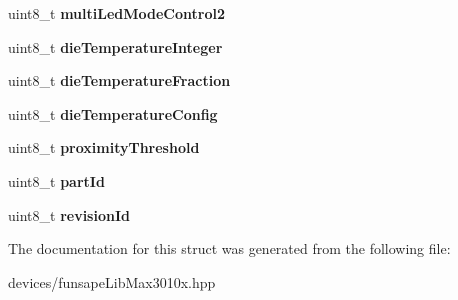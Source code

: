 \begin{DoxyCompactItemize}
\item 
\hypertarget{struct_max3010x_1_1_register_map_a3b161864d02cb2266e9137d4e24dc054}{}uint8\+\_\+t {\bfseries multi\+Led\+Mode\+Control2}\label{struct_max3010x_1_1_register_map_a3b161864d02cb2266e9137d4e24dc054}

\item 
\hypertarget{struct_max3010x_1_1_register_map_a33a9a4aba4610622715cedad48a55113}{}uint8\+\_\+t {\bfseries die\+Temperature\+Integer}\label{struct_max3010x_1_1_register_map_a33a9a4aba4610622715cedad48a55113}

\item 
\hypertarget{struct_max3010x_1_1_register_map_a00fda2118f70e025ae9ece2a9a7899a3}{}uint8\+\_\+t {\bfseries die\+Temperature\+Fraction}\label{struct_max3010x_1_1_register_map_a00fda2118f70e025ae9ece2a9a7899a3}

\item 
\hypertarget{struct_max3010x_1_1_register_map_aabccb8db2ec29ea00fe6a04534e6ecab}{}uint8\+\_\+t {\bfseries die\+Temperature\+Config}\label{struct_max3010x_1_1_register_map_aabccb8db2ec29ea00fe6a04534e6ecab}

\item 
\hypertarget{struct_max3010x_1_1_register_map_a883c8fdd281ff27168a7cd62fe6a4b0d}{}uint8\+\_\+t {\bfseries proximity\+Threshold}\label{struct_max3010x_1_1_register_map_a883c8fdd281ff27168a7cd62fe6a4b0d}

\item 
\hypertarget{struct_max3010x_1_1_register_map_af94016d2d2fcafe91cc776cb2d76bb0d}{}uint8\+\_\+t {\bfseries part\+Id}\label{struct_max3010x_1_1_register_map_af94016d2d2fcafe91cc776cb2d76bb0d}

\item 
\hypertarget{struct_max3010x_1_1_register_map_a18653f79ad81f57681546b04b2e60f22}{}uint8\+\_\+t {\bfseries revision\+Id}\label{struct_max3010x_1_1_register_map_a18653f79ad81f57681546b04b2e60f22}

\end{DoxyCompactItemize}


The documentation for this struct was generated from the following file\+:\begin{DoxyCompactItemize}
\item 
devices/funsape\+Lib\+Max3010x.\+hpp\end{DoxyCompactItemize}

